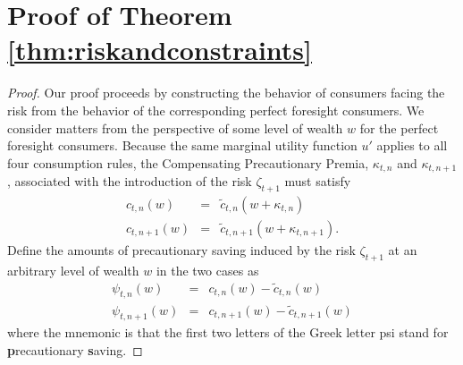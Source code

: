 \section{Proof of Theorem \ref{thm:riskandconstraints}}\label{app:riskandconstraints}

\begin{proof}


Our proof proceeds by constructing the behavior of consumers facing the risk from the behavior of the corresponding perfect foresight consumers.  We consider matters from the perspective of some level of wealth ${w}$ for the perfect foresight consumers.  Because the same marginal utility function $u'$ applies to all four consumption rules, the Compensating Precautionary Premia, $\kappa_{t,n}$ and $\kappa_{t,n+1}$, associated with the introduction of the risk $\zeta_{t+1}$  must satisfy
\begin{eqnarray}
 c_{t,n}({w}) & = & \tilde{c}_{t,n}({w}+\kappa_{t,n}) \label{eq:hateqtildehat2}
\\ c_{t,n+1}({w}) & = & \tilde{c}_{t,n+1}({w}+\kappa_{t,n+1}). \label{eq:hateqtildehat}\end{eqnarray}
Define the amounts of precautionary saving induced by the risk $\zeta_{t+1}$ at an arbitrary level of wealth $w$ in the two cases as
\begin{eqnarray}
  \psi_{t,n}(w) & = & c_{t,n}(w)-\tilde{c}_{t,n}(w)
\\   \psi_{t,n+1}(w) & = & c_{t,n+1}(w)-\tilde{c}_{t,n+1}(w)
\end{eqnarray}
where the mnemonic is that the first two letters of the Greek letter psi stand
for {\bf p}recautionary {\bf s}aving.


\end{proof}

